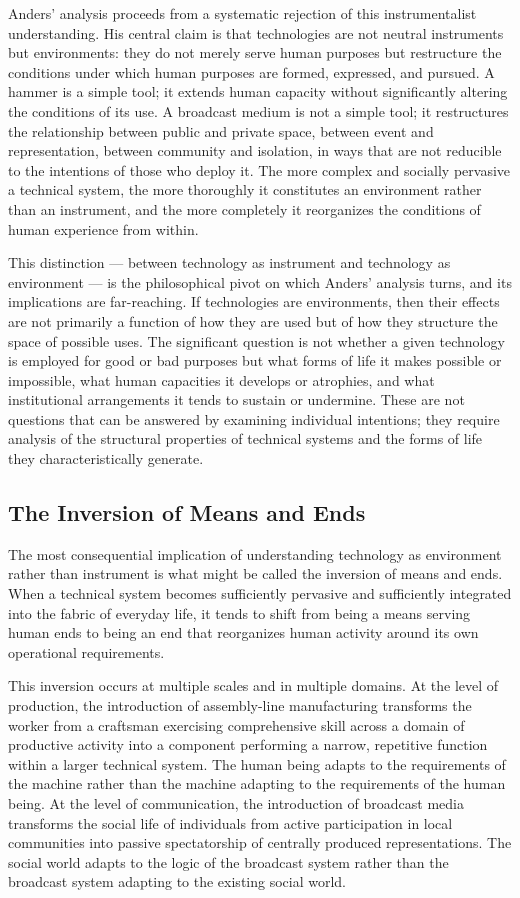 \documentclass[12pt]{memoir}
\begin{document}
Anders' analysis proceeds from a systematic rejection of this instrumentalist
understanding. His central claim is that technologies are not neutral instruments but
environments: they do not merely serve human purposes but restructure the conditions
under which human purposes are formed, expressed, and pursued. A hammer is a simple
tool; it extends human capacity without significantly altering the conditions of its
use. A broadcast medium is not a simple tool; it restructures the relationship between
public and private space, between event and representation, between community and
isolation, in ways that are not reducible to the intentions of those who deploy it.
The more complex and socially pervasive a technical system, the more thoroughly it
constitutes an environment rather than an instrument, and the more completely it
reorganizes the conditions of human experience from within.

This distinction — between technology as instrument and technology as environment —
is the philosophical pivot on which Anders' analysis turns, and its implications are
far-reaching. If technologies are environments, then their effects are not primarily
a function of how they are used but of how they structure the space of possible uses.
The significant question is not whether a given technology is employed for good or bad
purposes but what forms of life it makes possible or impossible, what human capacities
it develops or atrophies, and what institutional arrangements it tends to sustain or
undermine. These are not questions that can be answered by examining individual
intentions; they require analysis of the structural properties of technical systems
and the forms of life they characteristically generate.

\subsection{The Inversion of Means and Ends}

The most consequential implication of understanding technology as environment rather
than instrument is what might be called the inversion of means and ends. When a
technical system becomes sufficiently pervasive and sufficiently integrated into the
fabric of everyday life, it tends to shift from being a means serving human ends to
being an end that reorganizes human activity around its own operational requirements.

This inversion occurs at multiple scales and in multiple domains. At the level of
production, the introduction of assembly-line manufacturing transforms the worker from
a craftsman exercising comprehensive skill across a domain of productive activity into
a component performing a narrow, repetitive function within a larger technical system.
The human being adapts to the requirements of the machine rather than the machine
adapting to the requirements of the human being. At the level of communication, the
introduction of broadcast media transforms the social life of individuals from active
participation in local communities into passive spectatorship of centrally produced
representations. The social world adapts to the logic of the broadcast system rather
than the broadcast system adapting to the existing social world.
\end{document}
